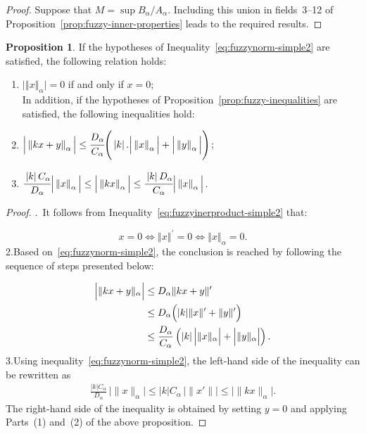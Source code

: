 \documentclass[preprint,12pt]{elsarticle}
\newcommand{\norm}[1]{\left\Vert#1\right\Vert}
\newcommand{\abs}[1]{\left\vert#1\right\vert}
\theoremstyle{definition}
\newtheorem{proposition}{Proposition}[section]
\begin{document}
\begin{proof}
	Suppose that $M=\sup B_\alpha / A_\alpha$. Including this union in fields~3--12 of Proposition~\ref{prop:fuzzy-inner-properties} leads to the required results.
	
\end{proof}
\begin{proposition}If the hypotheses of Inequality~\eqref{eq:fuzzynorm-simple2} are satisfied, the following relation holds:
	\begin{enumerate}
		\item \(\big\vert\norm{x}_\alpha \big\vert= 0\) if and only if \(x = 0\);\\
		In addition, if the hypotheses of Proposition~\ref{prop:fuzzy-inequalities} are satisfied, the following inequalities hold:
			\item \(\Big\vert\norm{kx+y}_\alpha \Big\vert\leq \cfrac{D_\alpha}{C_\alpha}\Bigg(\abs{k}.\Big\vert\norm{x}_\alpha \Big\vert+\Big\vert \norm{y}_\alpha \Big\vert\Bigg) \);
		\item \(\cfrac{\abs{k}C_\alpha}{D_\alpha}\Big\vert\norm{x}_\alpha \Big\vert\leq \Big\vert\norm{kx}_\alpha \Big\vert\leq \cfrac{\abs{k}D_\alpha}{C_\alpha}\Big\vert \norm{x}_\alpha \Big\vert \).
	
	\end{enumerate}
	\begin{proof}
		.\ It follows from Inequality~\eqref{eq:fuzzyinerproduct-simple2} that:
		
		\[
		x=0\Leftrightarrow \norm{x}^\prime=0\Leftrightarrow  \norm{x}_\alpha=0.
		\]
		\noindent 2.Based on~\eqref{eq:fuzzynorm-simple2}, the conclusion is reached by following the sequence of steps presented below:
		
	\begin{align*}
		\Bigl|\|kx+y\|_{\alpha}\Bigr|
		&\le D_{\alpha}\|kx+y\|^\prime \\
		&\le D_{\alpha}\Bigl(|k|\|x\|^\prime+\|y\|^\prime\Bigr) \\
		&\le  \frac{D_{\alpha}}{C_{\alpha}}
		\left(|k|\,\Bigl|\|x\|_{\alpha}\Bigr|
		+ \Bigl|\|y\|_{\alpha}\Bigr|\right).
	\end{align*}
		\noindent 3.Using inequality~\eqref{eq:fuzzynorm-simple2}, the left-hand side of the inequality can be rewritten as
		\begin{align*}
			\frac{|k|C_\alpha}{D_\alpha}\,\bigl|\|x\|_\alpha\bigr|
			\le |k|C_\alpha\,\bigl|\|x'\|\bigr|
			\le \bigl|\|kx\|_\alpha\bigr|.
		\end{align*}
		The right-hand side of the inequality is obtained by setting $y=0$ and applying Parts~(1) and~(2) of the above proposition.
		

\end{proof}
\end{proposition}
\end{document}
